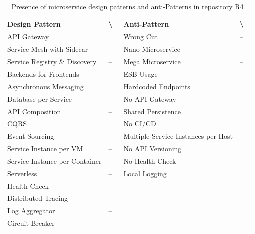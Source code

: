 \documentclass{Configuration_Files/PoliMi3i_thesis}
\newcommand{\cmark}{\ding{51}}%
\begin{document}
\begin{table}[H]
\centering 
    \begin{tabular}{ 
  | >{\centering\arraybackslash} m{16em} 
  | >{\centering\arraybackslash} m{2.2em} 
  | >{\centering\arraybackslash} m{16em} 
  | >{\centering\arraybackslash} m{2.2em} | }
    \hline
    \rowcolor{bluepoli!40}
    \textbf{Design Pattern} & \cmark \textbackslash – & \textbf{Anti-Pattern} & \cmark \textbackslash – \T\B \\
    \hline \hline
    API Gateway & \cmark & Wrong Cut & – \T\B\\
    \hline
    \rowcolor{bluepoli!10}
    Service Mesh with Sidecar & – & Nano Microservice & – \T\B \\
    \hline
    Service Registry \& Discovery & – & Mega Microservice & – \T\B \\
    \hline
    \rowcolor{bluepoli!10}
    Backends for Frontends & – & ESB Usage & – \T\B \\
    \hline
    Asynchronous Messaging & \cmark & Hardcoded Endpoints & \cmark \T\B \\
    \hline
    \rowcolor{bluepoli!10}
    Database per Service & – & No API Gateway & – \T\B \\
    \hline
    API Composition & – & Shared Persistence & \cmark \T\B \\
    \hline
    \rowcolor{bluepoli!10}
    CQRS & \cmark & No CI/CD & \cmark \T\B \\
    \hline
    Event Sourcing & \cmark & Multiple Service Instances per Host & – \T\B \\
    \hline
    \rowcolor{bluepoli!10}
    Service Instance per VM & – & No API Versioning & \cmark \T\B \\
    \hline
    Service Instance per Container & \cmark & No Health Check & \cmark \T\B \\
    \hline
    \rowcolor{bluepoli!10}
    Serverless & – & Local Logging & \cmark \T\B \\
    \hline
    Health Check & – &  & \T\B \\
    \hline
    \rowcolor{bluepoli!10}
    Distributed Tracing & – & & \T\B \\
    \hline
    Log Aggregator & – &  & \T\B \\
    \hline
    \rowcolor{bluepoli!10}
    Circuit Breaker & – &  & \T\B \\
    \hline
    \end{tabular}
    \\[10pt]
    \caption{Presence of microservice design patterns and anti-Patterns in repository R4}
    \label{table:R4_result}
\end{table}
\end{document}
